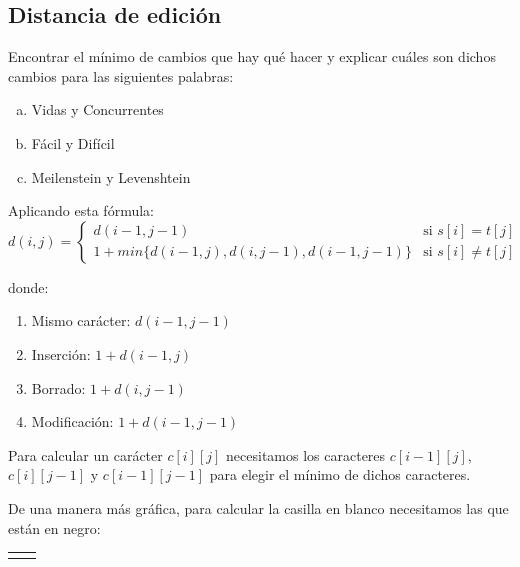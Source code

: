 \documentclass[10pt,a4paper,spanish]{report}
\theoremstyle{definition}
\theoremstyle{remark}
\begin{document}
\subsection{\textcolor{amethyst}Distancia de edición}

Encontrar el mínimo de cambios que hay qué hacer y explicar cuáles son dichos cambios para las siguientes palabras:
\begin{enumerate}[a)]
    \item Vidas y Concurrentes
    \item Fácil y Difícil
    \item Meilenstein y Levenshtein
\end{enumerate}

Aplicando esta fórmula:
\begin{equation*}
    d(i,j) = 
    \begin{cases}
        d(i-1,j-1) & \textrm{si $s[i] = t[j]$} \\
        1 + min\{ d(i-1,j), d(i,j-1), d(i-1,j-1) \} & \textrm{si $s[i] \neq t[j]$}
    \end{cases}
\end{equation*}

donde:
\begin{enumerate}[$\bullet$]
    \item Mismo carácter: $d(i-1,j-1)$
    \item Inserción: $1 + d(i-1,j)$
    \item Borrado: $1 + d(i,j-1)$
    \item Modificación: $1 + d(i-1,j-1)$
\end{enumerate}

Para calcular un carácter $c[i][j]$ necesitamos los caracteres $c[i-1][j]$, $c[i][j-1]$ y $c[i-1][j-1]$ para elegir el mínimo de dichos caracteres. 

De una manera más gráfica, para calcular la casilla en blanco necesitamos las que están en negro:

\begin{center}
\begin{tabular}{|c|c|}
\hline
\rowcolor{Black} &  \\
\hline
\cellcolor{Black} & \\
\hline
\end{tabular}
\end{center}
\end{document}
